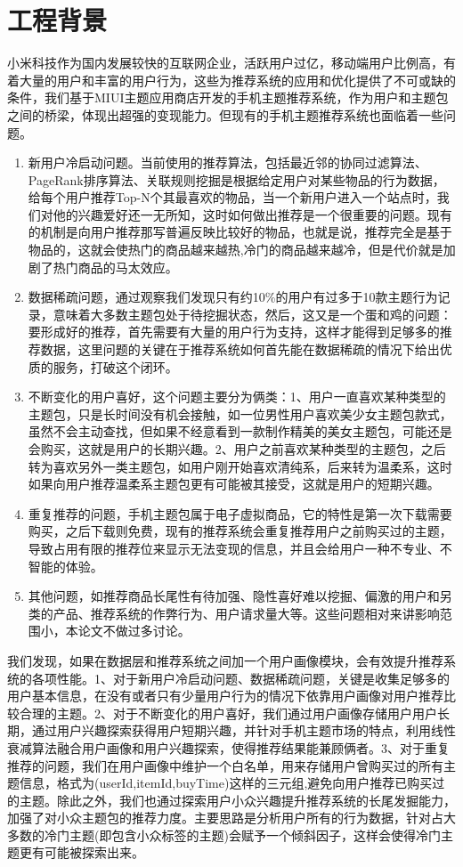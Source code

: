 \section{工程背景}
	小米科技作为国内发展较快的互联网企业，活跃用户过亿，移动端用户比例高，有着大量的用户和丰富的用户行为，这些为推荐系统的应用和优化提供了不可或缺的条件，我们基于MIUI主题应用商店开发的手机主题推荐系统，作为用户和主题包之间的桥梁，体现出超强的变现能力。但现有的手机主题推荐系统也面临着一些问题。
	\begin{enumerate}[(1)]
	\item 新用户冷启动问题。当前使用的推荐算法，包括最近邻的协同过滤算法、PageRank排序算法、关联规则挖掘是根据给定用户对某些物品的行为数据，给每个用户推荐Top-N个其最喜欢的物品，当一个新用户进入一个站点时，我们对他的兴趣爱好还一无所知，这时如何做出推荐是一个很重要的问题。现有的机制是向用户推荐那写普遍反映比较好的物品，也就是说，推荐完全是基于物品的，这就会使热门的商品越来越热,冷门的商品越来越冷，但是代价就是加剧了热门商品的马太效应。

	\item 数据稀疏问题，通过观察我们发现只有约10\%的用户有过多于10款主题行为记录，意味着大多数主题包处于待挖掘状态，然后，这又是一个蛋和鸡的问题：要形成好的推荐，首先需要有大量的用户行为支持，这样才能得到足够多的推荐数据，这里问题的关键在于推荐系统如何首先能在数据稀疏的情况下给出优质的服务，打破这个闭环。

	\item 不断变化的用户喜好，这个问题主要分为俩类：1、用户一直喜欢某种类型的主题包，只是长时间没有机会接触，如一位男性用户喜欢美少女主题包款式，虽然不会主动查找，但如果不经意看到一款制作精美的美女主题包，可能还是会购买，这就是用户的长期兴趣。2、用户之前喜欢某种类型的主题包，之后转为喜欢另外一类主题包，如用户刚开始喜欢清纯系，后来转为温柔系，这时如果向用户推荐温柔系主题包更有可能被其接受，这就是用户的短期兴趣。

	\item 重复推荐的问题，手机主题包属于电子虚拟商品，它的特性是第一次下载需要购买，之后下载则免费，现有的推荐系统会重复推荐用户之前购买过的主题，导致占用有限的推荐位来显示无法变现的信息，并且会给用户一种不专业、不智能的体验。

	\item 其他问题，如推荐商品长尾性有待加强、隐性喜好难以挖掘、偏激的用户和另类的产品、推荐系统的作弊行为、用户请求量大等。这些问题相对来讲影响范围小，本论文不做过多讨论。
	\end{enumerate}

	我们发现，如果在数据层和推荐系统之间加一个用户画像模块，会有效提升推荐系统的各项性能。1、对于新用户冷启动问题、数据稀疏问题，关键是收集足够多的用户基本信息，在没有或者只有少量用户行为的情况下依靠用户画像对用户推荐比较合理的主题。2、对于不断变化的用户喜好，我们通过用户画像存储用户用户长期，通过用户兴趣探索获得用户短期兴趣，并针对手机主题市场的特点，利用线性衰减算法融合用户画像和用户兴趣探索，使得推荐结果能兼顾俩者。3、对于重复推荐的问题，我们在用户画像中维护一个白名单，用来存储用户曾购买过的所有主题信息，格式为(userId,itemId,buyTime)这样的三元组,避免向用户推荐已购买过的主题。除此之外，我们也通过探索用户小众兴趣提升推荐系统的长尾发掘能力，加强了对小众主题包的推荐力度。主要思路是分析用户所有的行为数据，针对占大多数的冷门主题(即包含小众标签的主题)会赋予一个倾斜因子，这样会使得冷门主题更有可能被探索出来。

